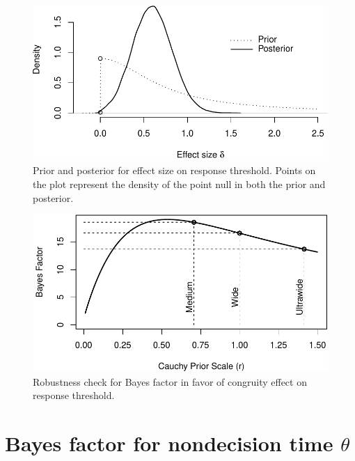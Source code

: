 \documentclass[english,floatsintext,doc]{apa6}
\theoremstyle{definition}
\theoremstyle{definition}
\theoremstyle{definition}
\theoremstyle{remark}
\begin{document}
\begin{figure}
\centering
\includegraphics{supplement_files/figure-latex/alphaPosterior-1.pdf}
\caption{\label{fig:alphaPosterior}Prior and posterior for effect size on
response threshold. Points on the plot represent the density of the
point null in both the prior and posterior.}
\end{figure}

\begin{figure}
\centering
\includegraphics{supplement_files/figure-latex/alphaRobustness-1.pdf}
\caption{\label{fig:alphaRobustness}Robustness check for Bayes factor in
favor of congruity effect on response threshold.}
\end{figure}

\section{\texorpdfstring{Bayes factor for nondecision time
\(\theta\)}{Bayes factor for nondecision time \textbackslash{}theta}}\label{bayes-factor-for-nondecision-time-theta}
\end{document}
